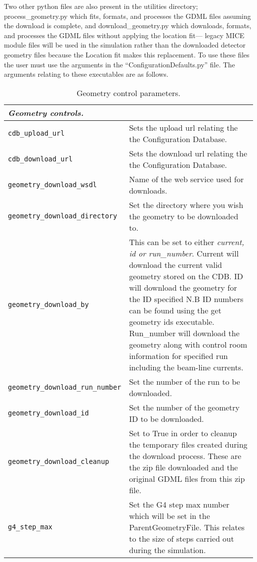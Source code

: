Two other python files are also present in the utilities directory;
process\_geometry.py which fits, formats, and processes the GDML files
assuming the download is complete, and download\_geometry.py which
downloads, formats, and processes the GDML files without applying the
location fit--- legacy MICE module files will be used in the
simulation rather than the downloaded detector geometry files because
the Location fit makes this replacement. To use these files the user
must use the arguments in the ``ConfigurationDefaults.py'' file. The
arguments relating to these executables are as follows.

\begin{table*}
\begin{center}
\caption{Geometry control parameters.}
\begin{tabularx}{\textwidth}{lX}
\hline
\multicolumn{2}{l}{\emph{Geometry controls.}} \\
\hline
\verb|cdb_upload_url| & Sets the upload url relating the the Configuration Database.\\
\verb|cdb_download_url| & Sets the download url relating the the Configuration Database.\\
\verb|geometry_download_wsdl| & Name of the web service used for downloads.\\
\verb|geometry_download_directory| & Set the directory where you wish the geometry to be downloaded to.\\
\verb|geometry_download_by| & This can be set to either \textit{current, id or run\_number}. Current will download the current valid geometry stored
on the CDB. ID will download the geometry for the ID specified N.B ID numbers can be found using the get geometry ids executable. Run\_number will
download the geometry along with control room information for specified run including the beam-line currents. \\ 
\verb|geometry_download_run_number| & Set the number of the run to be downloaded.\\
\verb|geometry_download_id| & Set the number of the geometry ID to be downloaded.\\
\verb|geometry_download_cleanup| & Set to True in order to cleanup the temporary files created during the download process. These are the zip file
downloaded and the original GDML files from this zip file.\\
\verb|g4_step_max| & Set the G4 step max number which will be set in the ParentGeometryFile. This relates to the size of steps carried out during
the simulation.\\

\end{tabularx}
\end{center}
\end{table*}
